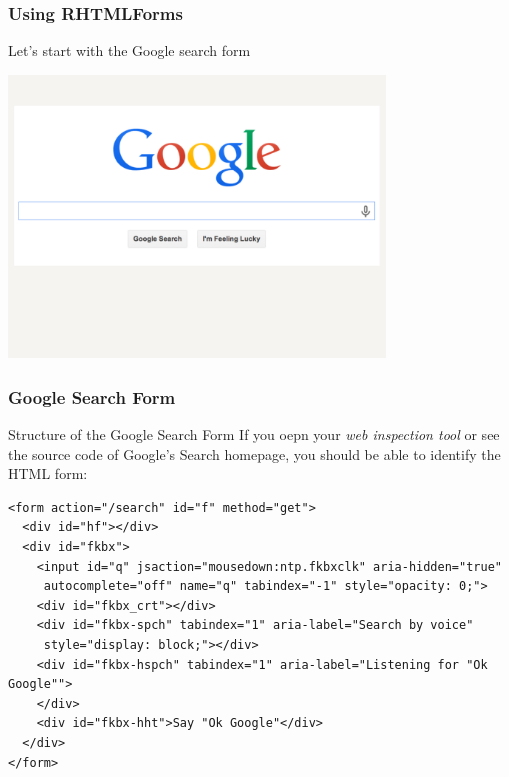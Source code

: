 \documentclass{beamer}\usepackage[]{graphicx}\usepackage[]{color}
\begin{document}
\begin{frame}[fragile]
\frametitle{Using RHTMLForms}

\begin{center}
Let's start with the Google search form

\includegraphics[width=10cm]{images/html_form_google.pdf}
\end{center}

\end{frame}


\begin{frame}[fragile]
\frametitle{Google Search Form}

\begin{block}{Structure of the Google Search Form}
If you oepn your \textit{web inspection tool} or see the source code of Google's Search homepage, you should be able to identify the HTML form:
\end{block}

{\scriptsize
\begin{verbatim}
<form action="/search" id="f" method="get">
  <div id="hf"></div>
  <div id="fkbx">
    <input id="q" jsaction="mousedown:ntp.fkbxclk" aria-hidden="true" 
     autocomplete="off" name="q" tabindex="-1" style="opacity: 0;">
    <div id="fkbx_crt"></div>
    <div id="fkbx-spch" tabindex="1" aria-label="Search by voice"
     style="display: block;"></div>
    <div id="fkbx-hspch" tabindex="1" aria-label="Listening for "Ok Google"">
    </div>
    <div id="fkbx-hht">Say "Ok Google"</div>    
  </div>
</form>
\end{verbatim}
}

\end{frame}

\end{document}
